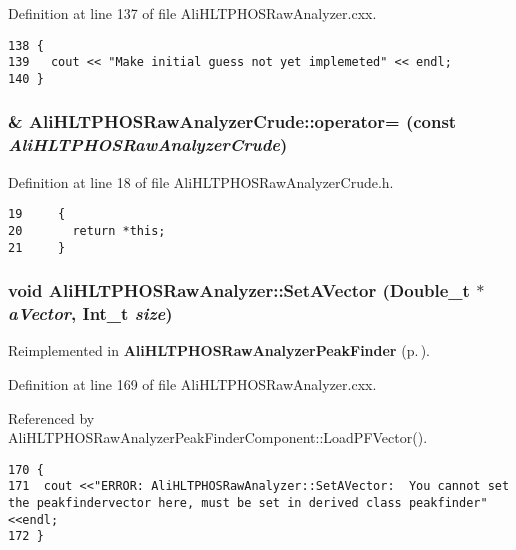 Definition at line 137 of file Ali\-HLTPHOSRaw\-Analyzer.cxx.

\footnotesize\begin{verbatim}138 {
139   cout << "Make initial guess not yet implemeted" << endl;
140 }
\end{verbatim}\normalsize 


\subsubsection{\& Ali\-HLTPHOSRaw\-Analyzer\-Crude::operator= (const  {\em Ali\-HLTPHOSRaw\-Analyzer\-Crude})\hspace{0.3cm}{\tt  [inline]}}\label{classAliHLTPHOSRawAnalyzerCrude_AliHLTPHOSRawAnalyzerCrudea2}




Definition at line 18 of file Ali\-HLTPHOSRaw\-Analyzer\-Crude.h.

\footnotesize\begin{verbatim}19     {
20       return *this; 
21     }
\end{verbatim}\normalsize 


\subsubsection{\setlength{\rightskip}{0pt plus 5cm}void Ali\-HLTPHOSRaw\-Analyzer::Set\-AVector (Double\_\-t $\ast$ {\em a\-Vector}, Int\_\-t {\em size})\hspace{0.3cm}{\tt  [virtual, inherited]}}\label{classAliHLTPHOSRawAnalyzer_AliHLTPHOSRawAnalyzerLMSa17}




Reimplemented in {\bf Ali\-HLTPHOSRaw\-Analyzer\-Peak\-Finder} {\rm (p.\,\pageref{classAliHLTPHOSRawAnalyzerPeakFinder_AliHLTPHOSRawAnalyzerPeakFindera5})}.

Definition at line 169 of file Ali\-HLTPHOSRaw\-Analyzer.cxx.

Referenced by Ali\-HLTPHOSRaw\-Analyzer\-Peak\-Finder\-Component::Load\-PFVector().

\footnotesize\begin{verbatim}170 {
171  cout <<"ERROR: AliHLTPHOSRawAnalyzer::SetAVector:  You cannot set the peakfindervector here, must be set in derived class peakfinder"<<endl;
172 }
\end{verbatim}\normalsize 


